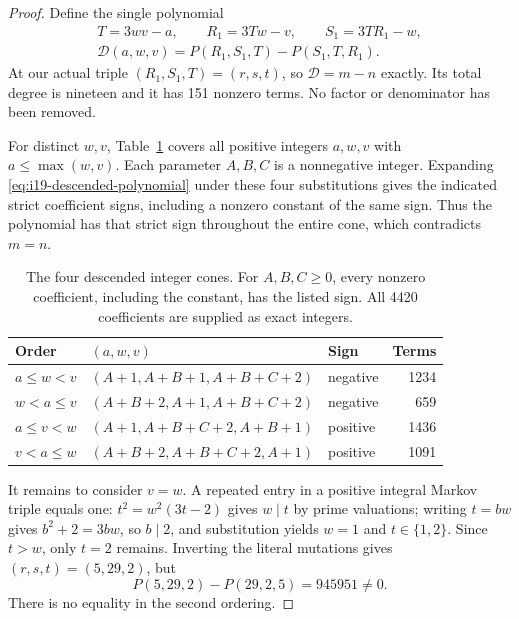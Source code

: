 \begin{proof}
Define the single polynomial
\begin{equation}
 \begin{gathered}
 T=3wv-a,\qquad R_1=3Tw-v,\qquad S_1=3TR_1-w,\\
 \mathscr D(a,w,v)=P(R_1,S_1,T)-P(S_1,T,R_1).
 \end{gathered}
 \label{eq:i19-descended-polynomial}
\end{equation}
At our actual triple $(R_1,S_1,T)=(r,s,t)$, so $\mathscr D=m-n$ exactly. Its total degree is nineteen and it has 151 nonzero terms. No factor or denominator has been removed.

For distinct $w,v$, Table~\ref{tab:i19-cones} covers all positive integers $a,w,v$ with $a\leqslant\max(w,v)$. Each parameter $A,B,C$ is a nonnegative integer. Expanding \eqref{eq:i19-descended-polynomial} under these four substitutions gives the indicated strict coefficient signs, including a nonzero constant of the same sign. Thus the polynomial has that strict sign throughout the entire cone, which contradicts $m=n$.

\begin{table}[htbp]
\centering\small
\begin{tabular}{@{}lll r@{}}
\toprule
Order & $(a,w,v)$ & Sign & Terms\\
\midrule
$a\leqslant w<v$ & $(A+1,A+B+1,A+B+C+2)$ & negative & 1234\\
$w<a\leqslant v$ & $(A+B+2,A+1,A+B+C+2)$ & negative & 659\\
$a\leqslant v<w$ & $(A+1,A+B+C+2,A+B+1)$ & positive & 1436\\
$v<a\leqslant w$ & $(A+B+2,A+B+C+2,A+1)$ & positive & 1091\\
\bottomrule
\end{tabular}
\caption{The four descended integer cones. For $A,B,C\geqslant0$, every nonzero coefficient, including the constant, has the listed sign. All 4420 coefficients are supplied as exact integers.}
\label{tab:i19-cones}
\end{table}

It remains to consider $v=w$. A repeated entry in a positive integral Markov triple equals one: $t^2=w^2(3t-2)$ gives $w\mid t$ by prime valuations; writing $t=bw$ gives $b^2+2=3bw$, so $b\mid2$, and substitution yields $w=1$ and $t\in\{1,2\}$. Since $t>w$, only $t=2$ remains. Inverting the literal mutations gives $(r,s,t)=(5,29,2)$, but
$$
 P(5,29,2)-P(29,2,5)=945951\ne0.
$$
There is no equality in the second ordering.


\end{proof}
